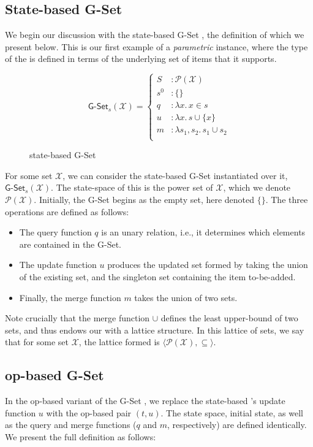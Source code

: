 \subsection{State-based G-Set}

We begin our discussion with the state-based G-Set \CRDT, the definition of
which we present below. This is our first example of a \emph{parametric} \CRDT
instance, where the type of the \CRDT is defined in terms of the underlying set
of items that it supports.

\begin{figure}[H]
  \centering
  \[
    \textsf{G-Set}_s(\mathcal{X}) = \left\{\begin{aligned}
      S &: \mathcal{P}(\mathcal{X}) \\
      s^0 &: \{ \} \\
      q &: \lambda x.\, x \in s \\
      u &: \lambda x.\, s \cup \{ x \} \\
      m &: \lambda s_1, s_2.\, s_1 \cup s_2 \\
    \end{aligned}\right.
  \]
  \caption{state-based \textsf{G-Set} \CRDT}
  \label{fig:gset-state}
\end{figure}

For some set $\mathcal{X}$, we can consider the state-based G-Set \CRDT
instantiated over it, $\textsf{G-Set}_s(\mathcal{X})$. The state-space of this
\CRDT is the power set of $\mathcal{X}$, which we denote
$\mathcal{P}(\mathcal{X})$. Initially, the G-Set begins as the empty set, here
denoted $\{ \}$. The three operations are defined as follows:
\begin{itemize}
  \item The query function $q$ is an unary relation, i.e., it determines which
    elements are contained in the G-Set.
  \item The update function $u$ produces the updated set formed by taking the
    union of the existing set, and the singleton set containing the item
    to-be-added.
  \item Finally, the merge function $m$ takes the union of two sets.
\end{itemize}
Note crucially that the merge function $\cup$ defines the least upper-bound of
two sets, and thus endows our \CRDT with a lattice structure. In this lattice of
sets, we say that for some set $\mathcal{X}$, the lattice formed is $\langle
\mathcal{P}(\mathcal{X}), \subseteq \rangle$.

\subsection{op-based G-Set}
In the op-based variant of the G-Set \CRDT, we replace the state-based \CRDT's
update function $u$ with the op-based pair $(t,u)$. The state space, initial
state, as well as the query and merge functions ($q$ and $m$, respectively) are
defined identically. We present the full definition as follows:

